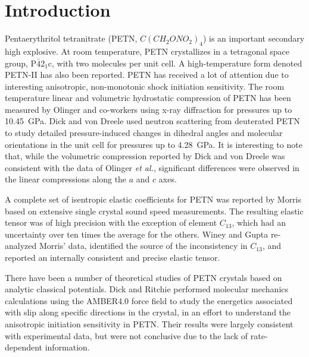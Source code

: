 \documentclass[prb,aps,nobibnotes,twocolumn,doublespace,twocolumngrid,superbib]{revtex4}
\begin{document}
\section{Introduction}
Pentaerythritol tetranitrate (PETN, $C(CH_2ONO_2)_4$) is an important
secondary high explosive.  At room temperature, PETN crystallizes in a
tetragonal space group, P$\bar{4}$2$_1$c, with two molecules per unit
cell\cite{Booth_1947v,Trotter_1963v16,Conant_1979}.  A
high-temperature form denoted PETN-II has also been
reported.\cite{Cady_1975vB41} PETN has received a lot of attention due
to interesting anisotropic, non-monotonic shock initiation
sensitivity.\cite{Dick_1984v44,Dick_1991v70,Gallagher_1992v339,Dick_1997v81,Gruzdkov_2000v104,Yoo_2000v88}
The room temperature linear and volumetric hydrostatic compression of
PETN has been measured by Olinger and
co-workers\cite{Olinger_1975v62,Olinger_1976} using x-ray diffraction
for pressures up to 10.45~GPa.  Dick and von Dreele\cite{Dick_1997}
used neutron scattering from deuterated PETN to study detailed
pressure-induced changes in dihedral angles and molecular orientations
in the unit cell for pressures up to 4.28~GPa.  It is interesting to
note that, while the volumetric compression reported by Dick and von
Dreele was consistent with the data of Olinger {\it et al.},
significant differences were observed in the linear compressions along
the $a$ and $c$ axes.

A complete set of isentropic elastic coefficients for PETN was
reported by Morris\cite{Morris_1976} based on extensive single crystal
sound speed measurements.  The resulting elastic tensor was of high
precision with the exception of element $C_{13}$, which had an
uncertainty over ten times the average for the others.  Winey and
Gupta\cite{Winey_2001v90} re-analyzed Morris' data, identified the
source of the inconsistency in $C_{13}$, and reported an internally
consistent and precise elastic tensor.

There have been a number of theoretical studies of PETN crystals based
on analytic classical potentials.  Dick and Ritchie\cite{Dick_1994v76}
performed molecular mechanics calculations using the AMBER4.0 force
field to study the energetics associated with slip along specific
directions in the crystal, in an effort to understand the anisotropic
initiation sensitivity in PETN.  Their results were largely consistent
with experimental data, but were not conclusive due to the lack of
rate-dependent information. 
\end{document}
